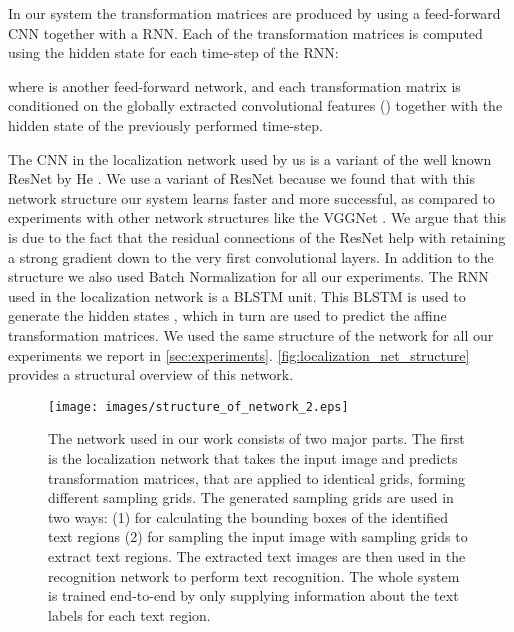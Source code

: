\documentclass[10pt,twocolumn,letterpaper]{article}
\begin{document}
	In our system the  transformation matrices  are produced by using a feed-forward \ac{CNN} together with a \ac{RNN}. Each of the  transformation matrices is computed using the hidden state  for each time-step of the \ac{RNN}:
	
	where  is another feed-forward network, and each transformation matrix  is conditioned on the globally extracted convolutional features () together with the hidden state of the previously performed time-step.

	The \ac{CNN} in the localization network used by us is a variant of the well known ResNet by He \etal \cite{He2016Deep}.
	We use a variant of ResNet because we found that with this network structure our system learns faster and more successful, as compared to experiments with other network structures like the VGGNet \cite{Simonyan2015Very}.
	We argue that this is due to the fact that the residual connections of the ResNet help with retaining a strong gradient down to the very first convolutional layers.
	In addition to the structure we also used Batch Normalization \cite{Ioffe2015Batcha} for all our experiments.
	The \ac{RNN} used in the localization network is a \ac{BLSTM} \cite{Graves2013Hybrid,Hochreiter1997Long} unit.
	This \ac{BLSTM} is used to generate the hidden states , which in turn are used to predict the affine transformation matrices.
	We used the same structure of the network for all our experiments we report in \autoref{sec:experiments}.
	\autoref{fig:localization_net_structure} provides a structural overview of this network.

\begin{figure*}[t]
	\begin{center}
		\texttt{[image: images/structure\_of\_network\_2.eps]}
	\end{center}
	\caption{The network used in our work consists of two major parts. The first is the localization network that takes the input image and predicts  transformation matrices, that are applied to  identical grids, forming  different sampling grids. The generated sampling grids are used in two ways:
(1) for calculating the bounding boxes of the identified text regions
	(2) for sampling the input image with  sampling grids to extract  text regions. 
	The  extracted text images are then used in the recognition network to perform text recognition.
	The whole system is trained end-to-end by only supplying information about the text labels for each text region.}
	\label{fig:localization_net_structure}
\end{figure*}
\end{document}
